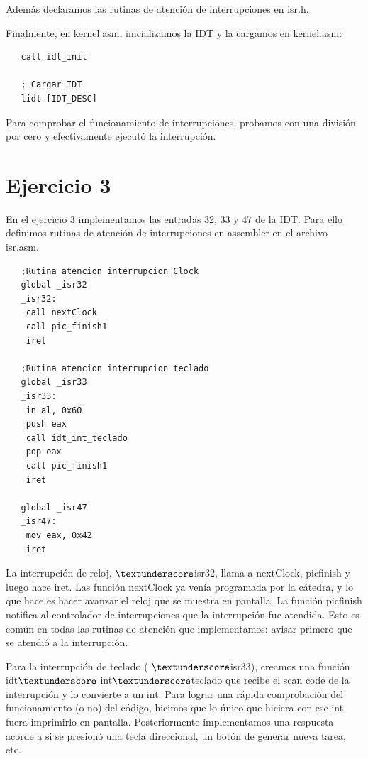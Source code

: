\documentclass[a4paper]{article}
\newenvironment{codesnippet}{%
	\begin{Sbox}\begin{minipage}{\textwidth}\sffamily\small}%
	{\end{minipage}\end{Sbox}%
		\begin{center}%
		\vspace{-0.4cm}\colorbox{litegrey}{\TheSbox}\end{center}\vspace{0.3cm}}
\begin{document}
Además declaramos las rutinas de atención de interrupciones en isr.h.

Finalmente, en kernel.asm, inicializamos la IDT y la cargamos en kernel.asm:

	\begin{codesnippet}
  \begin{verbatim}
   call idt_init

   ; Cargar IDT
   lidt [IDT_DESC]
	  \end{verbatim}
\end{codesnippet}

Para comprobar el funcionamiento de interrupciones, probamos con una división por cero y efectivamente ejecutó la
interrupción.

\section{Ejercicio 3}

En el ejercicio 3 implementamos las entradas 32, 33 y 47 de la IDT. Para ello definimos rutinas de atención de
interrupciones en assembler en el archivo isr.asm. 

	\begin{codesnippet}
  \begin{verbatim}
   ;Rutina atencion interrupcion Clock
   global _isr32
   _isr32:
	call nextClock
	call pic_finish1
	iret

   ;Rutina atencion interrupcion teclado
   global _isr33
   _isr33:
	in al, 0x60
	push eax
	call idt_int_teclado
	pop eax
	call pic_finish1
	iret

   global _isr47
   _isr47:
	mov eax, 0x42
	iret
	  \end{verbatim}
\end{codesnippet}

La interrupción de reloj, $\textunderscore$isr32, llama a nextClock, picfinish y luego hace iret. Las función nextClock
ya venía programada por la cátedra, y lo que hace es hacer avanzar el reloj que se muestra en pantalla. La función
picfinish notifica al controlador de interrupciones que la interrupción fue atendida. Esto es común en todas las rutinas
de atención que implementamos: avisar primero que se atendió a la interrupción.

Para la interrupción de teclado ( $\textunderscore$isr33), creamos una función idt$\textunderscore$
int$\textunderscore$teclado que recibe el scan code de la interrupción y lo convierte a un int. Para lograr una rápida
comprobación del funcionamiento (o no) del código, hicimos que lo único que hiciera con ese int fuera imprimirlo en
pantalla. Posteriormente implementamos una respuesta acorde   a si se presionó una tecla direccional, un botón de
generar nueva tarea, etc.
\end{document}
